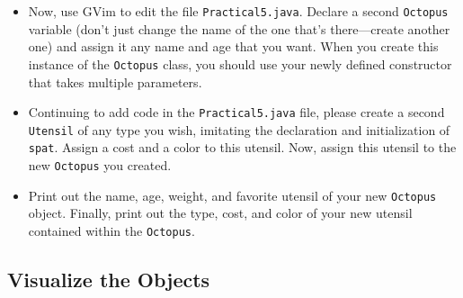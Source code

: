 \begin{enumerate}
\begin{itemize}
\item Now, use GVim to edit the file {\tt Practical5.java}. Declare a second {\tt Octopus} variable (don't just change
    the name of the one that's there---create another one) and assign it any name and age that you want. When you create
  this instance of the {\tt Octopus} class, you should use your newly defined constructor that takes multiple
  parameters.

\item \noindent Continuing to add code in the {\tt Practical5.java} file, please create a second {\tt Utensil} of any
  type you wish, imitating the declaration and initialization of {\tt spat}.  Assign a cost and a color to this utensil.
  Now, assign this utensil to the new {\tt Octopus} you created. 

\item \noindent Print out the name, age, weight, and favorite utensil of your new {\tt Octopus} object. Finally, print
  out the type, cost, and color of your new utensil contained within the {\tt Octopus}.

\end{itemize}
\end{enumerate}

\vspace*{-.35in}
\subsection*{Visualize the Objects} 
\vspace*{-.05in}


